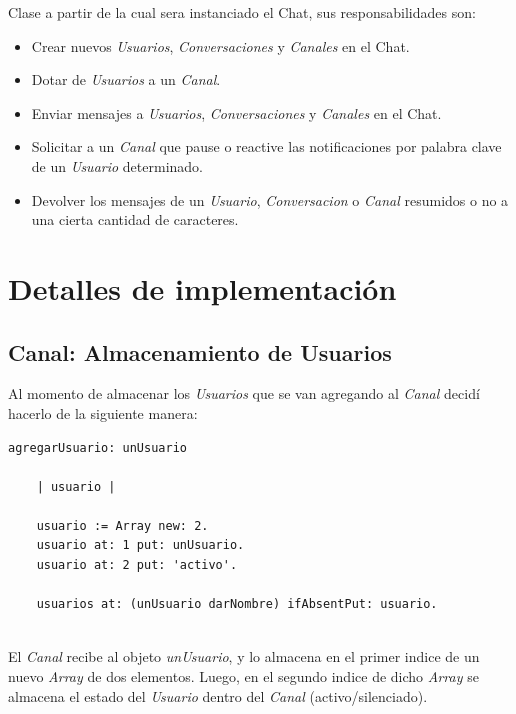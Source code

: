 \documentclass[titlepage,a4paper]{article}
\begin{document}
Clase a partir de la cual sera instanciado el Chat, sus responsabilidades son:

\begin{itemize}
	\item Crear nuevos \textit{Usuarios}, \textit{Conversaciones} y \textit{Canales} en el Chat.
	\item Dotar de \textit{Usuarios} a un \textit{Canal}.
	\item Enviar mensajes a \textit{Usuarios}, \textit{Conversaciones} y \textit{Canales} en el Chat.
	\item Solicitar a un \textit{Canal} que pause o reactive las notificaciones por palabra clave de un \textit{Usuario} determinado.
	\item Devolver los mensajes de un \textit{Usuario}, \textit{Conversacion} o \textit{Canal} resumidos o no a una cierta cantidad de caracteres.
\end{itemize}

\section{Detalles de implementación}\label{sec:implementacion}

\subsection{Canal: Almacenamiento de Usuarios}\label{subsec:implementacionCanal}

Al momento de almacenar los \textit{Usuarios} que se van agregando al \textit{Canal} decidí hacerlo de la siguiente manera:
\\
\begin{verbatim}
agregarUsuario: unUsuario

    | usuario |

    usuario := Array new: 2.
    usuario at: 1 put: unUsuario.
    usuario at: 2 put: 'activo'.

    usuarios at: (unUsuario darNombre) ifAbsentPut: usuario.
    
\end{verbatim}

El \textit{Canal} recibe al objeto \textit{unUsuario}, y lo almacena en el primer indice de un nuevo \textit{Array} de dos elementos. Luego, en el segundo indice de dicho \textit{Array} se almacena el estado del \textit{Usuario} dentro del \textit{Canal} (activo/silenciado).
\end{document}
